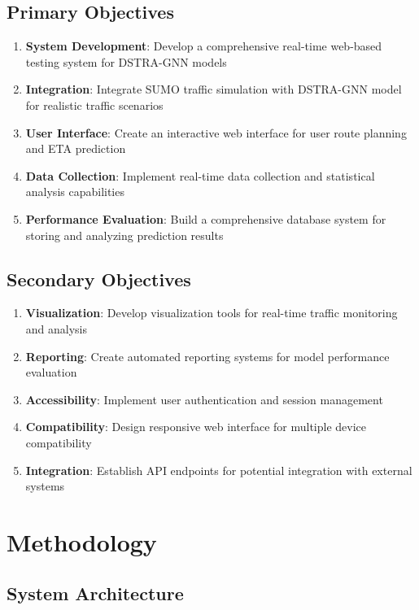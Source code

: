\documentclass[12pt,a4paper]{article}
\begin{document}
\subsection{Primary Objectives}

\begin{enumerate}
    \item \textbf{System Development}: Develop a comprehensive real-time web-based testing system for DSTRA-GNN models
    \item \textbf{Integration}: Integrate SUMO traffic simulation with DSTRA-GNN model for realistic traffic scenarios
    \item \textbf{User Interface}: Create an interactive web interface for user route planning and ETA prediction
    \item \textbf{Data Collection}: Implement real-time data collection and statistical analysis capabilities
    \item \textbf{Performance Evaluation}: Build a comprehensive database system for storing and analyzing prediction results
\end{enumerate}

\subsection{Secondary Objectives}

\begin{enumerate}
    \item \textbf{Visualization}: Develop visualization tools for real-time traffic monitoring and analysis
    \item \textbf{Reporting}: Create automated reporting systems for model performance evaluation
    \item \textbf{Accessibility}: Implement user authentication and session management
    \item \textbf{Compatibility}: Design responsive web interface for multiple device compatibility
    \item \textbf{Integration}: Establish API endpoints for potential integration with external systems
\end{enumerate}

\section{Methodology}

\subsection{System Architecture}
\end{document}
